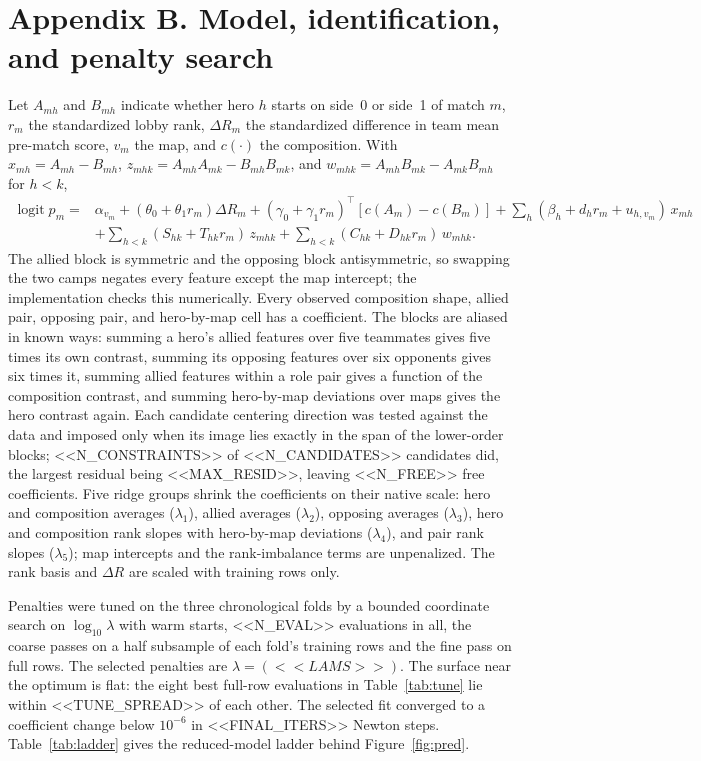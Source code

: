 \documentclass[11pt]{article}
\begin{document}
\section*{Appendix B. Model, identification, and penalty search}

Let $A_{mh}$ and $B_{mh}$ indicate whether hero $h$ starts on side~0 or side~1 of match $m$, $r_m$ the
standardized lobby rank, $\Delta R_m$ the standardized difference in team mean pre-match score, $v_m$ the
map, and $c(\cdot)$ the composition. With $x_{mh}=A_{mh}-B_{mh}$, $z_{mhk}=A_{mh}A_{mk}-B_{mh}B_{mk}$, and
$w_{mhk}=A_{mh}B_{mk}-A_{mk}B_{mh}$ for $h<k$,
\begin{align*}
\operatorname{logit}p_m ={}& \alpha_{v_m}+(\theta_0+\theta_1 r_m)\Delta R_m
 +(\gamma_0+\gamma_1 r_m)^\top[c(A_m)-c(B_m)]
 +\sum_h(\beta_h+d_h r_m+u_{h,v_m})\,x_{mh}\\
&+\sum_{h<k}(S_{hk}+T_{hk}r_m)\,z_{mhk}+\sum_{h<k}(C_{hk}+D_{hk}r_m)\,w_{mhk}.
\end{align*}
The allied block is symmetric and the opposing block antisymmetric, so swapping the two camps negates
every feature except the map intercept; the implementation checks this numerically. Every observed
composition shape, allied pair, opposing pair, and hero-by-map cell has a coefficient. The blocks are
aliased in known ways: summing a hero's allied features over five teammates gives five times its own
contrast, summing its opposing features over six opponents gives six times it, summing allied features
within a role pair gives a function of the composition contrast, and summing hero-by-map deviations over
maps gives the hero contrast again. Each candidate centering direction was tested against the data and
imposed only when its image lies exactly in the span of the lower-order blocks; <<N_CONSTRAINTS>> of
<<N_CANDIDATES>> candidates did, the largest residual being <<MAX_RESID>>, leaving <<N_FREE>> free
coefficients. Five ridge groups shrink the coefficients on their native scale: hero and composition
averages ($\lambda_1$), allied averages ($\lambda_2$), opposing averages ($\lambda_3$), hero and
composition rank slopes with hero-by-map deviations ($\lambda_4$), and pair rank slopes ($\lambda_5$);
map intercepts and the rank-imbalance terms are unpenalized. The rank basis and $\Delta R$ are scaled
with training rows only.

Penalties were tuned on the three chronological folds by a bounded coordinate search on $\log_{10}\lambda$
with warm starts, <<N_EVAL>> evaluations in all, the coarse passes on a half subsample of each fold's
training rows and the fine pass on full rows. The selected penalties are $\lambda=(<<LAMS>>)$. The
surface near the optimum is flat: the eight best full-row evaluations in Table~\ref{tab:tune} lie within
<<TUNE_SPREAD>> of each other. The selected fit converged to a coefficient change below $10^{-6}$ in
<<FINAL_ITERS>> Newton steps. Table~\ref{tab:ladder} gives the reduced-model ladder behind
Figure~\ref{fig:pred}.
\end{document}

